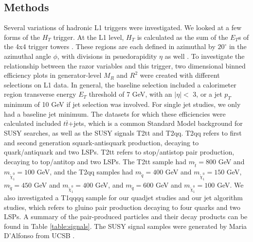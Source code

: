 \documentclass[twocolumn,aps,prd,reprint]{revtex4-1}
\begin{document}
\subsection{Methods}
Several variations of hadronic L1 triggers were investigated. We looked at a few forms of the $H_T$ trigger. At the L1 level, $H_T$ is calculated as the sum of the $E_T$s of the 4x4 trigger towers \cite{ucsb}.  These regions are each defined in azimuthal by $20^{\circ}$ in the azimuthal angle $\phi$, with divisions in psuedorapidity $\eta$ as well \cite{hlt}. To investigate the relationship between the razor variables and this trigger, two dimensional binned efficiency plots in generator-level $M_{R}$ and $R^2$ were created with different selections on L1 data. In general, the baseline selection included a calorimeter region transverse energy $E_T$ threshold of 7 GeV, with an $|\eta| <$  3, or a jet $p_T$ minimum of 10 GeV if jet selection was involved. For single jet studies, we only had a baseline jet minimum. The datasets for which these efficiencies were calculated included $t\bar{t}$+jets, which is a common Standard Model background for SUSY searches, as well as the SUSY signals T2tt and T2qq. T2qq refers to first and second generation squark-antisquark production, decaying to quark/antiquark and two LSPs. T2tt refers to stop/antistop pair production, decaying to top/antitop and two LSPs. The T2tt sample had $m_{\tilde{t}}=800$ GeV and $m_{\tilde{\chi}^0_1}=100$ GeV, and the T2qq samples had $m_{\tilde{q}}=400$ GeV and $m_{\tilde{\chi}^0_1}=150$ GeV, $m_{\tilde{q}}=450$ GeV and $m_{\tilde{\chi}^0_1}=400$ GeV, and $m_{\tilde{q}}=600$ GeV and $m_{\tilde{\chi}^0_1}=100$ GeV. We also investigated a T1qqqq sample for our quadjet studies and our jet algorithm studies, which refers to gluino pair production decaying to four quarks and two LSPs. A summary of the pair-produced particles and their decay products can be found in Table \ref{table:signals}. The SUSY signal samples were generated by Maria D'Alfonso from UCSB \cite{ucsb}. 
\end{document}
